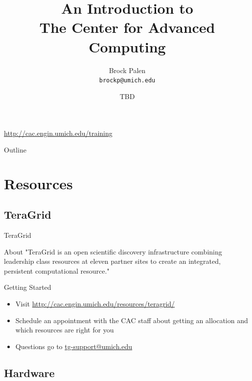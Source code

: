 \documentclass[handout]{beamer}
\title[CAC Intro] {An Introduction to\\ The Center for Advanced Computing}
\author{Brock Palen\\ \texttt{brockp@umich.edu}}
\date{TBD}
\begin{document}
  \begin{frame}
    \titlepage
    \url{http://cac.engin.umich.edu/training}
  \end{frame}

  \begin{frame}{Outline}
    \tableofcontents
  \end{frame}
  
  \section{Resources}
  \subsection {TeraGrid}
  \begin{frame}{TeraGrid}
   \begin{block}{About}
"TeraGrid is an open scientific discovery infrastructure combining leadership class resources at eleven partner sites to create an integrated, persistent computational resource."
   \end{block}
   \begin{block}{Getting Started}
    \begin{itemize}
     \item Visit \url{http://cac.engin.umich.edu/resources/teragrid/}
     \item Schedule an appointment with the CAC staff about getting an allocation and which resources are right for you
     \item Questions go to \url{tg-support@umich.edu}
    \end{itemize}
   \end{block}
  \end{frame}

  \subsection {Hardware}
\end{document}
